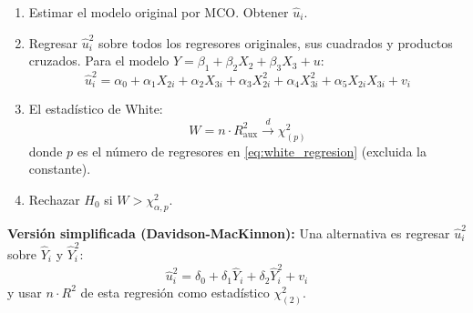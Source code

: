\documentclass[12pt,a4paper]{report}
\theoremstyle{definition}
\theoremstyle{remark}
\newcommand{\uhat}{\hat{u}}
\newcommand{\yhat}{\hat{Y}}
\begin{document}
\begin{tcolorbox}[notastyle, title={Procedimiento: Prueba de White}]
  \begin{enumerate}[label=\textbf{Paso \arabic*:}]
    \item Estimar el modelo original por MCO. Obtener $\uhat_i$.
    \item Regresar $\uhat_i^2$ sobre todos los regresores originales, sus cuadrados y productos cruzados. Para el modelo $Y = \beta_1 + \beta_2 X_2 + \beta_3 X_3 + u$:
    \begin{equation}
      \uhat_i^2 = \alpha_0 + \alpha_1 X_{2i} + \alpha_2 X_{3i} + \alpha_3 X_{2i}^2 + \alpha_4 X_{3i}^2 + \alpha_5 X_{2i}X_{3i} + v_i
      \label{eq:white_regresion}
    \end{equation}
    \item El estadístico de White:
    \begin{equation}
      W = n \cdot R_{\text{aux}}^2 \xrightarrow{d} \chi^2_{(p)}
      \label{eq:white_stat}
    \end{equation}
    donde $p$ es el número de regresores en \eqref{eq:white_regresion} (excluida la constante).
    \item Rechazar $H_0$ si $W > \chi^2_{\alpha, p}$.
  \end{enumerate}
\end{tcolorbox}

\textbf{Versión simplificada (Davidson-MacKinnon):} Una alternativa es regresar $\uhat_i^2$ sobre $\yhat_i$ y $\yhat_i^2$:
\begin{equation}
  \uhat_i^2 = \delta_0 + \delta_1 \yhat_i + \delta_2 \yhat_i^2 + v_i
  \label{eq:white_simple}
\end{equation}
y usar $n \cdot R^2$ de esta regresión como estadístico $\chi^2_{(2)}$.
\end{document}
